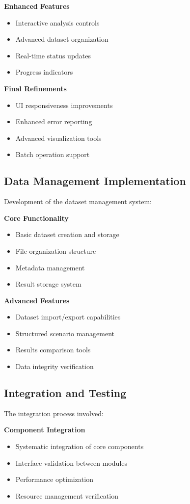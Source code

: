 \textbf{Enhanced Features}
\begin{itemize}
    \item Interactive analysis controls
    \item Advanced dataset organization
    \item Real-time status updates
    \item Progress indicators
\end{itemize}

\textbf{Final Refinements}
\begin{itemize}
    \item UI responsiveness improvements
    \item Enhanced error reporting
    \item Advanced visualization tools
    \item Batch operation support
\end{itemize}

\subsection{Data Management Implementation}
Development of the dataset management system:

\textbf{Core Functionality}
\begin{itemize}
    \item Basic dataset creation and storage
    \item File organization structure
    \item Metadata management
    \item Result storage system
\end{itemize}

\textbf{Advanced Features}
\begin{itemize}
    \item Dataset import/export capabilities
    \item Structured scenario management
    \item Results comparison tools
    \item Data integrity verification
\end{itemize}

\subsection{Integration and Testing}
The integration process involved:

\textbf{Component Integration}
\begin{itemize}
    \item Systematic integration of core components
    \item Interface validation between modules
    \item Performance optimization
    \item Resource management verification
\end{itemize}

